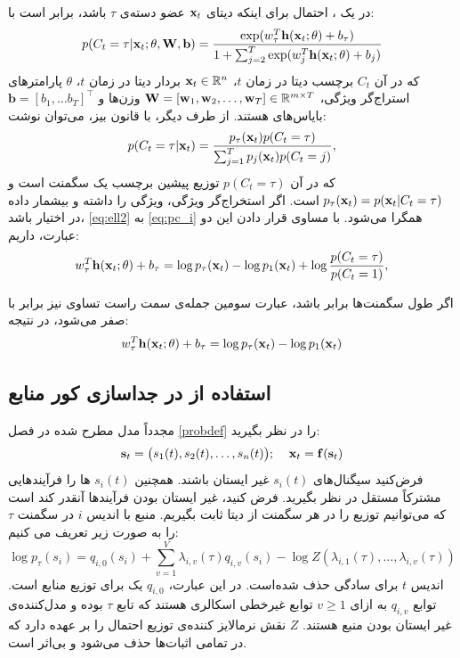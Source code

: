 \documentclass[oneside]{thesis}
\begin{document}
در یک 
،
احتمال
برای اینکه دیتای 
$\mathbf{x}_t$
عضو دسته‌ی 
$\tau$
باشد، برابر است با:
\begin{align}
p(C_t=\tau | \mathbf{x}_t; \mathbf{\theta},  \mathbf {W},  \mathbf {b})= 
\frac{\exp( w_\tau^T \mathbf{h}(\mathbf{x}_t; \mathbf{\theta})+b_\tau)}
{1+\sum_{j=2}^{T} \exp( w_j^T \mathbf{h}(\mathbf{x}_t; \mathbf{\theta})+b_j)}  \label{eq:ell2}
\end{align}
که در آن 
$C_t$
برچسب دیتا در زمان 
$t$،
$\mathbf{x}_t \in \mathbb{R}^n$
بردار دیتا در زمان $t$،
$\theta$
پارامتر‌های استراج‌گر ویژگی،
$\mathbf{W} = [\mathbf{w}_1, \mathbf{w}_2, \dots, \mathbf{w}_T] \in 
\mathbb{R}^{m \times T}$
وزن‌ها 
و 
$\mathbf{b} = [b_1, \dots b_T]^\top$
بایاس‌های 
هستند. از طرف دیگر، با قانون بیز، می‌توان نوشت:
\begin{equation}
p(C_t=\tau | \mathbf{x}_t) = \frac{p_\tau(\mathbf{x}_t)p(C_t = \tau)}
{\sum_{j=1}^{T} p_j(\mathbf{x}_t)p(C_t = j)},
\label{eq:pc_i}
\end{equation}
که در آن 
$p(C_t = \tau)$
توزیع پیشین برچسب یک سگمنت است و 
$p_\tau(\mathbf{x}_t) = p(\mathbf{x}_t| C_t = \tau)$
است. اگر استخراج‌گر ویژگی، ویژگی
را داشته و بیشمار داده در اختیار باشد، 
\eqref{eq:ell2}
به 
\eqref{eq:pc_i}
همگرا می‌شود. با مساوی قرار دادن این دو عبارت، داریم:
\begin{equation} 
w_\tau^T \mathbf{h}(\mathbf{x}_t; \mathbf{\theta}) + b_\tau 
= \log p_\tau(\mathbf{x}_t) - \log p_1(\mathbf{x}_t) + \log \frac{p(C_t = \tau)}{p(C_t = 1)} ,
\label{eq:relation}
\end{equation}

اگر طول سگمنت‌ها برابر باشد، عبارت سومین جمله‌ی سمت راست تساوی نیز برابر با صفر می‌شود، در نتیجه:
\begin{equation} 
w_\tau^T \mathbf{h}(\mathbf{x}_t; \mathbf{\theta}) + b_\tau 
= \log p_\tau(\mathbf{x}_t) - \log p_1(\mathbf{x}_t)
\label{eq:relation2}
\end{equation}

\subsection{	استفاده از
	در جداسازی کور منابع}
مجدداً مدل مطرح شده در فصل
\eqref{probdef}
را در نظر بگیرید:
\begin{equation}
\mathbf{s}_t = \big(s_1(t), s_2(t), \dots, s_n(t)\big);\;\;\;\;
\mathbf{x}_t = \mathbf{f}(\mathbf{s}_t)
\end{equation}
فرض‌کنید سیگنال‌های 
$s_i(t)$
غیر ایستان باشند.  همچنین 
$s_i(t)$
ها را فرآیندهایی مشترکاً مستقل در نظر بگیرید. فرض کنید، غیر ایستان بودن فرآیند‌ها آنقدر کند است که می‌توانیم توزیع را در هر سگمنت از دیتا ثابت بگیریم. 
منبع با اندیس 
$i$
در سگمنت
$\tau$
را به صورت زیر تعریف می کنیم:
\begin{equation} 
\log p_\tau(s_i)=  q_{i,0}(s_i) + \sum_{v=1}^V \lambda_{i,v}(\tau) q_{i,v}(s_i) - \log Z( \lambda_{i,1}(\tau),\ldots,\lambda_{i,v}(\tau))
\label{eq:p_tau}
\end{equation}
اندیس $t$ برای سادگی حذف شده‌است.
در این عبارت،
$q_{i, 0}$
یک
برای توزیع منابع است. توابع 
$q_{i, v}$
به ازای 
$ v\geq 1$
توابع غیرخطی اسکالری هستند که تابع 
$\tau$
بوده و مدل‌کننده‌ی غیر ایستان بودن منبع هستند.
$Z$
نقش نرمالایز کننده‌ی توزیع احتمال را بر عهده دارد که در تمامی اثبات‌ها حذف می‌شود و بی‌اثر است.
\end{document}

